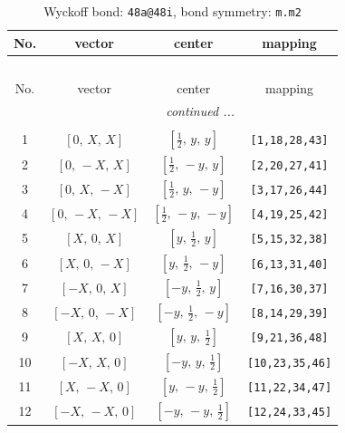 \documentclass[fleqn,8pt]{jsarticle}
\begin{document}
\begin{longtable}{cccc}
\caption{Wyckoff bond: {\tt 48a@48i}, bond symmetry: {\tt m.m2}}
 \\
 \hline \hline
No. & vector & center & mapping \\ \hline \endfirsthead

\multicolumn{3}{l}{\tablename\ \thetable{}} \\
 \hline \hline
No. & vector & center & mapping \\ \hline \endhead

 \hline \hline
\multicolumn{3}{r}{\footnotesize\it continued ...} \\ \endfoot

 \hline \hline
\multicolumn{3}{r}{} \\ \endlastfoot

1 & $\left[ 0,\, X,\, X \right]$ & $\left[ \frac{1}{2},\, y,\, y \right]$ & {\tt [1,18,28,43]} \\ \hline
2 & $\left[ 0,\, - X,\, X \right]$ & $\left[ \frac{1}{2},\, - y,\, y \right]$ & {\tt [2,20,27,41]} \\ \hline
3 & $\left[ 0,\, X,\, - X \right]$ & $\left[ \frac{1}{2},\, y,\, - y \right]$ & {\tt [3,17,26,44]} \\ \hline
4 & $\left[ 0,\, - X,\, - X \right]$ & $\left[ \frac{1}{2},\, - y,\, - y \right]$ & {\tt [4,19,25,42]} \\ \hline
5 & $\left[ X,\, 0,\, X \right]$ & $\left[ y,\, \frac{1}{2},\, y \right]$ & {\tt [5,15,32,38]} \\ \hline
6 & $\left[ X,\, 0,\, - X \right]$ & $\left[ y,\, \frac{1}{2},\, - y \right]$ & {\tt [6,13,31,40]} \\ \hline
7 & $\left[ - X,\, 0,\, X \right]$ & $\left[ - y,\, \frac{1}{2},\, y \right]$ & {\tt [7,16,30,37]} \\ \hline
8 & $\left[ - X,\, 0,\, - X \right]$ & $\left[ - y,\, \frac{1}{2},\, - y \right]$ & {\tt [8,14,29,39]} \\ \hline
9 & $\left[ X,\, X,\, 0 \right]$ & $\left[ y,\, y,\, \frac{1}{2} \right]$ & {\tt [9,21,36,48]} \\ \hline
10 & $\left[ - X,\, X,\, 0 \right]$ & $\left[ - y,\, y,\, \frac{1}{2} \right]$ & {\tt [10,23,35,46]} \\ \hline
11 & $\left[ X,\, - X,\, 0 \right]$ & $\left[ y,\, - y,\, \frac{1}{2} \right]$ & {\tt [11,22,34,47]} \\ \hline
12 & $\left[ - X,\, - X,\, 0 \right]$ & $\left[ - y,\, - y,\, \frac{1}{2} \right]$ & {\tt [12,24,33,45]} \\
\end{longtable}
\end{document}
